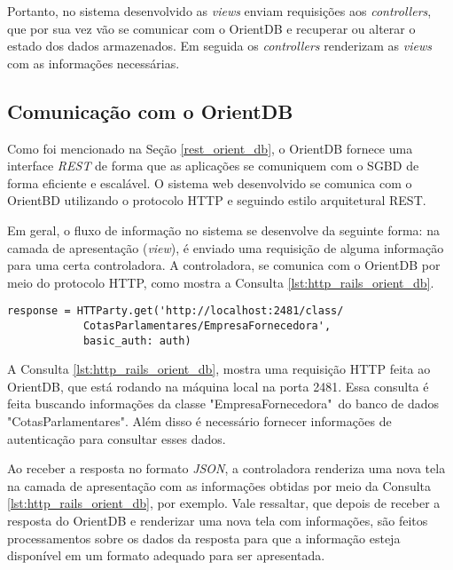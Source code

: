 Portanto, no sistema desenvolvido as \textit{views} enviam requisições aos \textit{controllers}, que por sua vez vão se comunicar com o OrientDB e recuperar ou alterar o estado dos dados armazenados. Em seguida os \textit{controllers} renderizam as \textit{views} com as informações necessárias.

\subsection{Comunicação com o OrientDB} \label{orient-communication}

	Como foi mencionado na Seção \ref{rest_orient_db}, o OrientDB fornece uma interface \textit{REST} de forma que as aplicações se comuniquem com o SGBD de forma eficiente e escalável. O sistema web desenvolvido se comunica com o OrientBD utilizando o protocolo HTTP e seguindo estilo arquitetural REST.
	
	Em geral, o fluxo de informação no sistema se desenvolve da seguinte forma: na camada de apresentação (\textit{view}), é enviado uma requisição de alguma informação para uma certa controladora. A controladora, se comunica com o OrientDB por meio do protocolo HTTP, como mostra a Consulta \ref{lst:http_rails_orient_db}.

\begin{lstlisting}[label={lst:http_rails_orient_db}, caption={Exemplo de consulta no OrientDB para retornar informações da classe de empresas fornecedoras.},captionpos=b]
response = HTTParty.get('http://localhost:2481/class/
			CotasParlamentares/EmpresaFornecedora', 
			basic_auth: auth)
\end{lstlisting}

A Consulta \ref{lst:http_rails_orient_db}, mostra uma requisição HTTP feita ao OrientDB, que está rodando na máquina local na porta 2481. Essa consulta é feita buscando informações da classe "EmpresaFornecedora"\ do banco de dados "CotasParlamentares". Além disso é necessário fornecer informações de autenticação para consultar esses dados.

Ao receber a resposta no formato \textit{JSON}, a controladora renderiza uma nova tela na camada de apresentação com as informações obtidas por meio da Consulta \ref{lst:http_rails_orient_db}, por exemplo. Vale ressaltar, que depois de receber a resposta do OrientDB e renderizar uma nova tela com informações, são feitos processamentos sobre os dados da resposta para que a informação esteja disponível em um formato adequado para ser apresentada.

